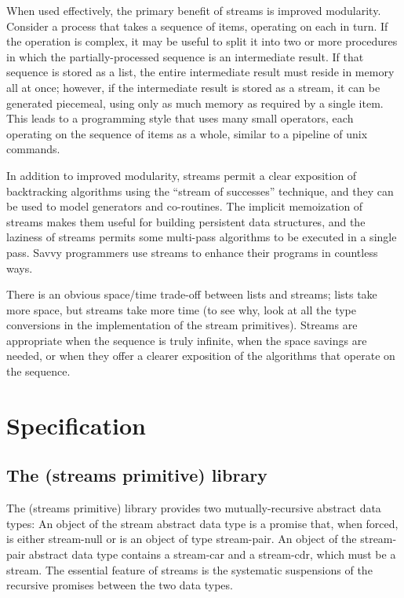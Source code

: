 When used effectively, the primary benefit of streams is improved
modularity. Consider a process that takes a sequence of items, operating
on each in turn. If the operation is complex, it may be useful to split
it into two or more procedures in which the partially-processed sequence
is an intermediate result. If that sequence is stored as a list, the
entire intermediate result must reside in memory all at once; however,
if the intermediate result is stored as a stream, it can be generated
piecemeal, using only as much memory as required by a single item. This
leads to a programming style that uses many small operators, each
operating on the sequence of items as a whole, similar to a pipeline of
unix commands.

In addition to improved modularity, streams permit a clear exposition of
backtracking algorithms using the ``stream of successes'' technique, and
they can be used to model generators and co-routines. The implicit
memoization of streams makes them useful for building persistent data
structures, and the laziness of streams permits some multi-pass
algorithms to be executed in a single pass. Savvy programmers use
streams to enhance their programs in countless ways.

There is an obvious space/time trade-off between lists and streams;
lists take more space, but streams take more time (to see why, look at
all the type conversions in the implementation of the stream
primitives). Streams are appropriate when the sequence is truly
infinite, when the space savings are needed, or when they offer a
clearer exposition of the algorithms that operate on the sequence.

\section{Specification}\label{specification}

\subsection{The (streams primitive)
library}\label{the-streams-primitive-library}

The (streams primitive) library provides two mutually-recursive abstract
data types: An object of the stream abstract data type is a promise
that, when forced, is either stream-null or is an object of type
stream-pair. An object of the stream-pair abstract data type contains a
stream-car and a stream-cdr, which must be a stream. The essential
feature of streams is the systematic suspensions of the recursive
promises between the two data types.

